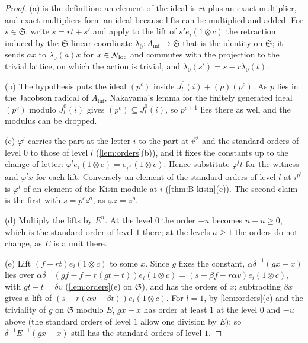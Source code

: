\begin{proof}
(a) is the definition: an element of the ideal is $rt$ plus an exact multiplier, and exact multipliers form an ideal because lifts can be multiplied and added. For $s\in\mathfrak S$, write $s=rt+s'$ and apply to the lift of $s'e_i(1\otimes c)$ the retraction induced by the $\mathfrak S$-linear coordinate
$\lambda_0\colon A_{\inf}\to\mathfrak S$ that is the identity on $\mathfrak S$; it sends $ax$ to $\lambda_0(a)x$ for $x\in\mathcal N_{\rm loc}$ and commutes with the projection to the trivial lattice, on which the action is trivial, and $\lambda_0(s')=s-r\lambda_0(t)$.

(b) The hypothesis puts the ideal $(p^c)$ inside $J^0_l(i)+(p)(p^c)$. As $p$ lies in the Jacobson radical of $A_{\inf}$, Nakayama's lemma for the finitely generated ideal $(p^c)$ modulo $J^0_l(i)$ gives $(p^c)\subseteq J^0_l(i)$, so $p^{c+1}$ lies there as well and the modulus can be dropped.

(c) $\varphi^l$ carries the part at the letter $i$ to the part at $i^{p^l}$ and the standard orders of level $0$ to those of level $l$ (\cref{lem:orders}(b)), and it fixes the constants up to the change of letter: $\varphi^le_i(1\otimes c)=e_{i^{p^l}}(1\otimes c)$. Hence substitute $\varphi^lt$ for the witness and
$\varphi^lx$ for each lift. Conversely an element of the standard orders of level $l$ at $i^{p^l}$ is $\varphi^l$ of an element of the Kisin module at $i$ (\cref{thm:B-kisin}(e)). The second claim is the first with $s=p^cz^a$, as $\varphi z=z^p$.

(d) Multiply the lifts by $E^n$. At the level $0$ the order $-u$ becomes $n-u\ge0$, which is the standard order of level $1$ there; at the levels $a\ge1$ the orders do not change, as $E$ is a unit there.

(e) Lift $(f-rt)e_i(1\otimes c)$ to some $x$. Since $g$ fixes the constant, $\alpha\delta^{-1}(gx-x)$ lies over $\alpha\delta^{-1}(gf-f-r(gt-t))e_i(1\otimes c)=(s+\beta f-r\alpha v)e_i(1\otimes c)$, with $gt-t=\delta v$ (\cref{lem:orders}(e) on $\mathfrak S$), and has the orders of $x$; subtracting $\beta x$ gives a
lift of $(s-r(\alpha v-\beta t))e_i(1\otimes c)$. For $l=1$, by \cref{lem:orders}(e) and the triviality of $g$ on $\mathfrak S$ modulo $E$, $gx-x$ has order at least $1$ at the level $0$ and $-u$ above (the standard orders of level $1$ allow one division by $E$); so $\delta^{-1}E^{-1}(gx-x)$ still has the standard
orders of level $1$.
\end{proof}

